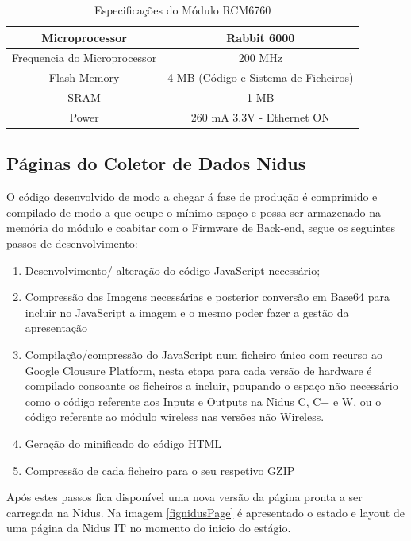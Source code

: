 \begin{table}[htb]
\centering
\caption{Especificações do Módulo RCM6760}\label{tab0}
    \begin{tabular}{|c|c|}\hline
  
Microprocessor&Rabbit 6000 \\\hline
Frequencia do Microprocessor  &200 MHz\\\hline
Flash Memory &4 MB (Código e Sistema de Ficheiros)\\\hline
SRAM&1 MB\\\hline
Power &260 mA  3.3V - Ethernet ON\\\hline
    \end{tabular}   
\end{table}

\subsection{Páginas do Coletor de Dados Nidus} \label{Página do Coletor de Dados Nidus}
\par
O código desenvolvido de modo a chegar á fase de produção é comprimido e compilado de modo a que ocupe o mínimo espaço e possa ser armazenado na memória do módulo e coabitar com o Firmware de Back-end, segue os seguintes passos de desenvolvimento:
\begin{enumerate}
\item Desenvolvimento/ alteração do código JavaScript necessário; 
\item Compressão das Imagens necessárias e posterior conversão em Base64 para incluir no JavaScript a imagem e o mesmo poder fazer a gestão da apresentação
\item Compilação/compressão do JavaScript num ficheiro único com recurso ao Google Clousure Platform, nesta etapa para cada versão de hardware é compilado consoante os ficheiros a incluir, poupando o espaço não necessário como o código referente aos Inputs e Outputs na Nidus C, C+ e W, ou o código referente ao módulo wireless nas versões não Wireless.
\item Geração do minificado do código HTML
\item Compressão de cada ficheiro para o seu respetivo GZIP
\end{enumerate}
\par
Após estes passos fica disponível uma nova versão da página pronta a ser carregada na Nidus.
Na imagem \ref{fignidusPage} é apresentado o estado e layout de uma página da Nidus IT no momento do inicio do estágio.

